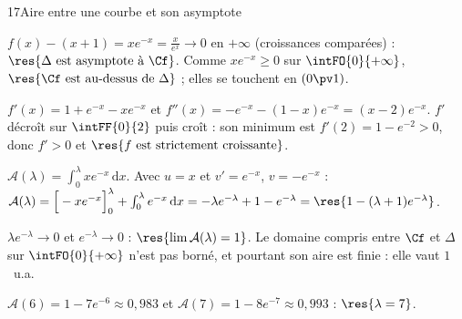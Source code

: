 \begin{corrige}{17}{Aire entre une courbe et son asymptote}
\noindent
\begin{minipage}[t]{0.54\linewidth}\vspace{0pt}\raggedright
\begin{questions}
  \item $f(x)-(x+1)=xe^{-x}=\frac{x}{e^{x}}\to0$ en $+\infty$ (croissances comparées) : $\res{\Delta\text{ est asymptote à }\Cf}$.
    Comme $xe^{-x}\geq0$ sur $\intFO{0}{+\infty}$, $\res{\Cf\text{ est au-dessus de }\Delta}$ ; elles se touchent en $(0\pv1)$.
  \item $f'(x)=1+e^{-x}-xe^{-x}$ et $f''(x)=-e^{-x}-(1-x)e^{-x}=(x-2)e^{-x}$. $f'$ décroît sur $\intFF{0}{2}$ puis croît : son
    minimum est $f'(2)=1-e^{-2}>0$, donc $f'>0$ et $\res{f\text{ est strictement croissante}}$.
  \item $\mathcal{A}(\lambda)=\int_0^{\lambda}xe^{-x}\,\mathrm{d}x$. Avec $u=x$ et $v'=e^{-x}$, $v=-e^{-x}$ :
    $\mathcal{A}(\lambda)=\Big[-xe^{-x}\Big]_0^{\lambda}+\int_0^{\lambda}e^{-x}\,\mathrm{d}x=-\lambda e^{-\lambda}+1-e^{-\lambda}=\res{1-(\lambda+1)e^{-\lambda}}$.
  \item $\lambda e^{-\lambda}\to0$ et $e^{-\lambda}\to0$ : $\res{\lim\mathcal{A}(\lambda)=1}$. Le domaine compris entre $\Cf$ et $\Delta$ sur
    $\intFO{0}{+\infty}$ n'est pas borné, et pourtant son aire est finie : elle vaut $1$~u.a.
  \item $\mathcal{A}(6)=1-7e^{-6}\approx0{,}983$ et $\mathcal{A}(7)=1-8e^{-7}\approx0{,}993$ : $\res{\lambda=7}$.
\end{questions}
\end{minipage}\hfill
\begin{minipage}[t]{0.42\linewidth}\vspace{1mm}
\centering
{}\\[0.5mm]
\end{minipage}
\end{corrige}

